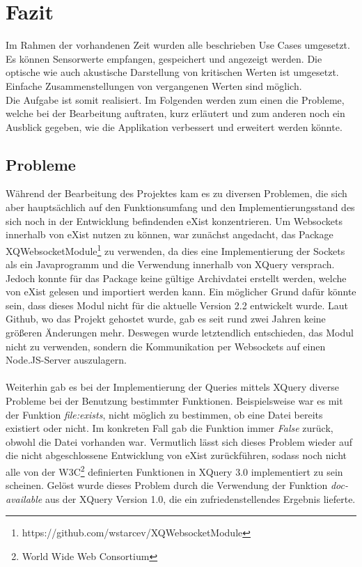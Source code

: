 \section{Fazit}
\label{sec:Fazit}
Im Rahmen der vorhandenen Zeit wurden alle beschrieben Use Cases umgesetzt. Es können Sensorwerte empfangen, gespeichert und angezeigt werden. Die optische wie auch akustische Darstellung von kritischen Werten ist umgesetzt. Einfache Zusammenstellungen von vergangenen Werten sind möglich.\\
Die Aufgabe ist somit realisiert. Im Folgenden werden zum einen die Probleme, welche bei der Bearbeitung auftraten, kurz erläutert und zum anderen noch ein Ausblick gegeben, wie die Applikation verbessert und erweitert werden könnte.


\subsection{Probleme}
\label{subsec:Probleme}
Während der Bearbeitung des Projektes kam es zu diversen Problemen, die sich aber hauptsächlich auf den Funktionsumfang und den Implementierungsstand des sich noch in der Entwicklung befindenden eXist konzentrieren. Um Websockets innerhalb von eXist nutzen zu können, war zunächst angedacht, das Package XQWebsocketModule\footnote[1]{https://github.com/wstarcev/XQWebsocketModule} zu verwenden, da dies eine Implementierung der Sockets als ein Javaprogramm und die Verwendung innerhalb von XQuery versprach. Jedoch konnte für das Package keine gültige Archivdatei erstellt werden, welche von eXist gelesen und importiert werden kann. Ein möglicher Grund dafür könnte sein, dass dieses Modul nicht für die aktuelle Version 2.2 entwickelt wurde. Laut Github, wo das Projekt gehostet wurde, gab es seit rund zwei Jahren keine größeren Änderungen mehr. Deswegen wurde letztendlich entschieden, das Modul nicht zu verwenden, sondern die Kommunikation per Websockets auf einen Node.JS-Server auszulagern.
\\
\\
Weiterhin gab es bei der Implementierung der Queries mittels XQuery diverse Probleme bei der Benutzung bestimmter Funktionen. Beispielsweise war es mit der Funktion \textit{file:exists}, nicht möglich zu bestimmen, ob eine Datei bereits existiert oder nicht. Im konkreten Fall gab die Funktion immer \textit{False} zurück, obwohl die Datei vorhanden war. Vermutlich lässt sich dieses Problem wieder auf die nicht abgeschlossene Entwicklung von eXist zurückführen, sodass noch nicht alle von der W3C\footnote[2]{World Wide Web Consortium} definierten Funktionen in XQuery 3.0 implementiert zu sein scheinen. Gelöst wurde dieses Problem durch die Verwendung der Funktion \textit{doc-available} aus der XQuery Version 1.0, die ein zufriedenstellendes Ergebnis lieferte.

